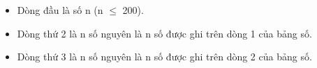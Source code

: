 \begin{itemize}
	\item Dòng đầu là số n (n $\le$  200).
	\item Dòng thứ 2 là n số nguyên là n số được ghi trên dòng 1 của bảng số.
	\item Dòng thứ 3 là n số nguyên là n số được ghi trên dòng 2 của bảng số.
\end{itemize}

\